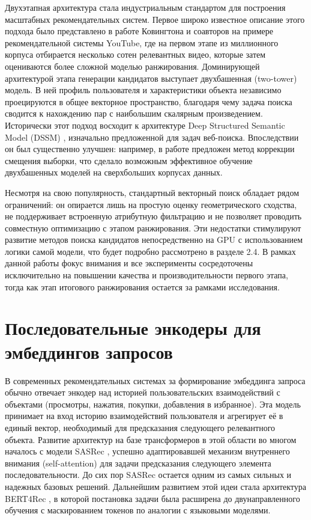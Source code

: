 \documentclass[14pt,a4paper]{extreport}
\numberwithin{figure}{chapter}
\numberwithin{table}{chapter}
\numberwithin{equation}{chapter}
\begin{document}
Двухэтапная архитектура стала индустриальным стандартом для построения масштабных рекомендательных систем. Первое широко известное описание этого подхода было представлено в работе Ковингтона и соавторов \cite{covington2016deep} на примере рекомендательной системы YouTube, где на первом этапе из миллионного корпуса отбирается несколько сотен релевантных видео, которые затем оцениваются более сложной моделью ранжирования. Доминирующей архитектурой этапа генерации кандидатов выступает двухбашенная (two-tower) модель. В ней профиль пользователя и характеристики объекта независимо проецируются в общее векторное пространство, благодаря чему задача поиска сводится к нахождению пар с наибольшим скалярным произведением. Исторически этот подход восходит к архитектуре Deep Structured Semantic Model (DSSM) \cite{huang2013learning}, изначально предложенной для задач веб-поиска. Впоследствии он был существенно улучшен: например, в работе \cite{yi2019sampling} предложен метод коррекции смещения выборки, что сделало возможным эффективное обучение двухбашенных моделей на сверхбольших корпусах данных.

Несмотря на свою популярность, стандартный векторный поиск обладает рядом ограничений: он опирается лишь на простую оценку геометрического сходства, не поддерживает встроенную атрибутную фильтрацию и не позволяет проводить совместную оптимизацию с этапом ранжирования. Эти недостатки стимулируют развитие методов поиска кандидатов непосредственно на GPU с использованием логики самой модели, что будет подробно рассмотрено в разделе 2.4. В рамках данной работы фокус внимания и все эксперименты сосредоточены исключительно на повышении качества и производительности первого этапа, тогда как этап итогового ранжирования остается за рамками исследования.

\section{Последовательные энкодеры для эмбеддингов запросов}

В современных рекомендательных системах за формирование эмбеддинга запроса обычно отвечает энкодер над историей пользовательских взаимодействий с объектами (просмотры, нажатия, покупки, добавления в избранное). Эта модель принимает на вход историю взаимодействий пользователя и агрегирует её в единый вектор, необходимый для предсказания следующего релевантного объекта. Развитие архитектур на базе трансформеров в этой области во многом началось с модели SASRec \cite{kang2018self}, успешно адаптировавшей механизм внутреннего внимания (self-attention) для задачи предсказания следующего элемента последовательности. До сих пор SASRec остается одним из самых сильных и надежных базовых решений. Дальнейшим развитием этой идеи стала архитектура BERT4Rec \cite{sun2019bert4rec}, в которой постановка задачи была расширена до двунаправленного обучения с маскированием токенов по аналогии с языковыми моделями.
\end{document}
